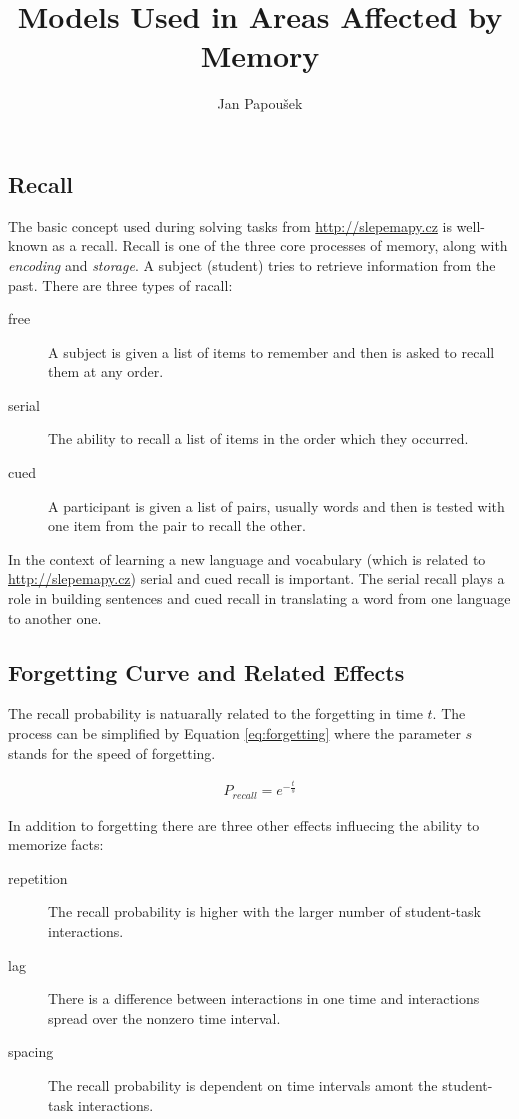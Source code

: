 \documentclass[a4paper]{article}
\title{Models Used in Areas Affected by Memory}
\author{Jan Papou\v{s}ek}
\begin{document}
\maketitle

\subsection{Recall}

The basic concept used during solving tasks from \url{http://slepemapy.cz} is well-known as a recall.
Recall is one of the three core processes of memory, along with \textit{encoding} and \textit{storage}. A subject (student)
tries to retrieve information from the past. There are three types of racall:

\begin{description}
	\item[free]		A subject is given a list of items to remember and then is asked to recall
								them at any order.
	\item[serial] The ability to recall a list of items in the order which they occurred.
	\item[cued]		A participant is given a list of pairs, usually words and then is tested
								with one item	from the pair to recall the other.
\end{description}

In the context of learning a new language and vocabulary (which is related to \url{http://slepemapy.cz})
serial and cued recall is important. The serial recall plays a role in building sentences and cued
recall in translating a word from one language to another one.

\subsection{Forgetting Curve and Related Effects}

The recall probability is natuarally related to the forgetting in time $t$. The process can be
simplified by Equation \ref{eq:forgetting} where the parameter $s$ stands for the speed of forgetting.

\begin{align}
\label{eq:forgetting}
P_{recall} = e^{-\frac{t}{s}}
\end{align}

In addition to forgetting there are three other effects influecing the ability to memorize facts:

\begin{description}
	\item[repetition] The recall probability is higher with the larger number of student-task
										interactions.
	\item[lag]	There is a difference between interactions in one time and interactions spread over
							the nonzero time interval.
	\item[spacing]	The recall probability is dependent on time intervals amont the student-task
									interactions.
\end{description}
\end{document}
